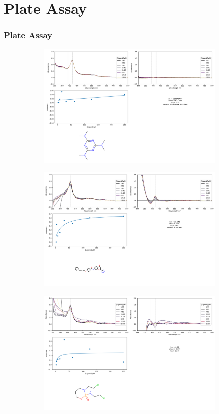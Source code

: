 \documentclass[10pt]{beamer}
\begin{document}
\section{Plate Assay}
\begin{frame}
	\frametitle{\textbf{Plate Assay }}
	\begin{figure}
	\begin{subfigure}{0.49\linewidth} 
	\includegraphics[width=\textwidth]{figs/Altretamine(Hexalen).png}
	\end{subfigure}
	\begin{subfigure}{0.49\linewidth} 
	\includegraphics[width=\textwidth]{figs/Pranlukast.png}
	\end{subfigure}
	\begin{subfigure}{0.49\linewidth} 
	\includegraphics[width=\textwidth]{figs/15.png}

\end{subfigure}
\end{figure}
\end{frame}
\end{document}
